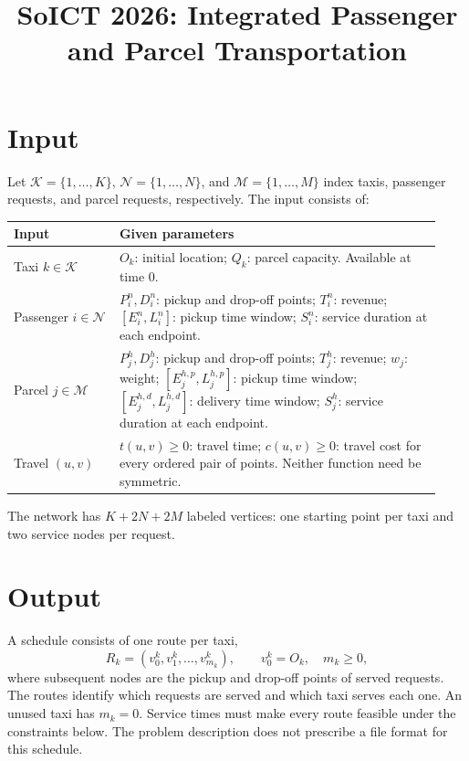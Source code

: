 \documentclass[11pt,a4paper]{article}
\title{SoICT 2026: Integrated Passenger and Parcel Transportation}
\date{}
\begin{document}
\maketitle

\section{Input}

Let $\mathcal K=\{1,\ldots,K\}$, $\mathcal N=\{1,\ldots,N\}$, and
$\mathcal M=\{1,\ldots,M\}$ index taxis, passenger requests, and parcel
requests, respectively. The input consists of:

\begin{center}
\renewcommand{\arraystretch}{1.35}
\begin{tabular}{@{}p{0.23\linewidth}p{0.70\linewidth}@{}}
\hline
\textbf{Input} & \textbf{Given parameters} \\
\hline
Taxi $k\in\mathcal K$
    & $O_k$: initial location; $Q_k$: parcel capacity. Available at time $0$. \\
\hline
Passenger $i\in\mathcal N$
    & $P_i^n,D_i^n$: pickup and drop-off points; $T_i^n$: revenue;
      $[E_i^n,L_i^n]$: pickup time window; $S_i^n$: service duration at
      each endpoint. \\
\hline
Parcel $j\in\mathcal M$
    & $P_j^h,D_j^h$: pickup and drop-off points; $T_j^h$: revenue;
      $w_j$: weight; $[E_j^{h,p},L_j^{h,p}]$: pickup time window;
      $[E_j^{h,d},L_j^{h,d}]$: delivery time window; $S_j^h$: service
      duration at each endpoint. \\
\hline
Travel $(u,v)$
    & $t(u,v)\geq 0$: travel time; $c(u,v)\geq 0$: travel cost for every
      ordered pair of points. Neither function need be symmetric. \\
\hline
\end{tabular}
\end{center}

The network has $K+2N+2M$ labeled vertices: one starting point per taxi and
two service nodes per request.

\section{Output}

A schedule consists of one route per taxi,
\[
    R_k=(v_0^k,v_1^k,\ldots,v_{m_k}^k),\qquad
    v_0^k=O_k,\quad m_k\geq 0,
\]
where subsequent nodes are the pickup and drop-off points of served requests.
The routes identify which requests are served and which taxi serves each one.
An unused taxi has $m_k=0$. Service times must make every route feasible under
the constraints below. The problem description does not prescribe a file format
for this schedule.
\end{document}
